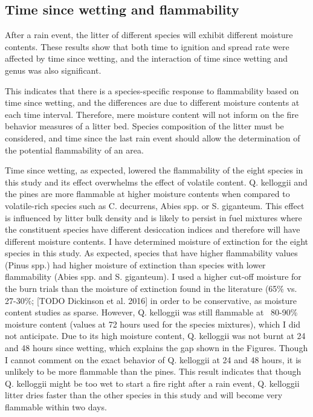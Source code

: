 \documentclass[fire,article,submit,moreauthors,pdftex]{Definitions/mdpi}
\begin{document}
\subsection{Time since wetting and flammability}

After a rain event, the litter of different species will exhibit different moisture contents. These results show that both time to ignition and spread rate were affected by time since wetting, and the interaction of time since wetting and genus was also significant.

This indicates that there is a species-specific response to flammability based on time since wetting, and the differences are due to different moisture contents at each time interval. Therefore, mere moisture content will not inform on the fire behavior measures of a litter bed. Species composition of the litter must be considered, and time since the last rain event should allow the determination of the potential flammability of an area. 

Time since wetting, as expected, lowered the flammability of the eight species in this study and its effect overwhelms the effect of volatile content. Q. kelloggii and the pines are more flammable at higher moisture contents when compared to volatile-rich species such as C. decurrens, Abies spp. or S. giganteum. This effect is influenced by litter bulk density and is likely to persist in fuel mixtures where the constituent species have different desiccation indices and therefore will have different moisture contents. I have determined moisture of extinction for the eight species in this study. As expected, species that have higher flammability values (Pinus spp.) had higher moisture of extinction than species with lower flammability (Abies spp. and S. giganteum). I used a higher cut-off moisture for the burn trials than the moisture of extinction found in the literature (65\% vs. 27-30\%; \citep{ Rothermel-1972} [TODO Dickinson et al. 2016] in order to be conservative, as moisture content studies as sparse. However, Q. kelloggii was still flammable at ~80-90\% moisture content (values at 72 hours used for the species mixtures), which I did not anticipate. Due to its high moisture content, Q. kelloggii was not burnt at 24 and 48 hours since wetting, which explains the gap shown in the Figures. Though I cannot comment on the exact behavior of Q. kelloggii at 24 and 48 hours, it is unlikely to be more flammable than the pines. This result indicates that though Q. kelloggii might be too wet to start a fire right after a rain event, Q. kelloggii litter dries faster than the other species in this study and will become very flammable within two days.
\end{document}
